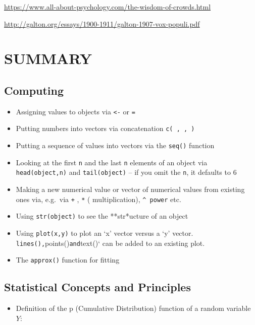 \documentclass[]{book}
\providecommand{\tightlist}{%
  \setlength{\itemsep}{0pt}\setlength{\parskip}{0pt}}
\begin{document}
\url{https://www.all-about-psychology.com/the-wisdom-of-crowds.html}

\url{http://galton.org/essays/1900-1911/galton-1907-vox-populi.pdf}

\hypertarget{summary-2}{%
\section{SUMMARY}\label{summary-2}}

\hypertarget{computing}{%
\subsection{Computing}\label{computing}}

\begin{itemize}
\item
  Assigning values to objects via \texttt{\textless{}-} or \texttt{=}
\item
  Putting numbers into vectors via concatenation \texttt{c(\ ,\ ,\ )}
\item
  Putting a sequence of values into vectors via the \texttt{seq()} function
\item
  Looking at the first \texttt{n} and the last \texttt{n} elements of an object via \texttt{head(object,n)} and \texttt{tail(object)} -- if you omit the \texttt{n}, it defaults to 6
\item
  Making a new numerical value or vector of numerical values from existing ones via, e.g.~via \texttt{+} , \texttt{*} ( multiplication), \texttt{\^{}\ power} etc.
\item
  Using \texttt{str(object)} to see the **str*ucture of an object
\item
  Using \texttt{plot(x,y)} to plot an `x' vector versus a `y' vector. \texttt{lines(),}points()\texttt{and}text()` can be added to an existing plot.
\item
  The \texttt{approx()} function for fitting
\end{itemize}

\hypertarget{statistical-concepts-and-principles}{%
\subsection{Statistical Concepts and Principles}\label{statistical-concepts-and-principles}}

\begin{itemize}
\tightlist
\item
  Definition of the p (Cumulative Distribution) function of a random variable \(Y:\)
\end{itemize}
\end{document}
